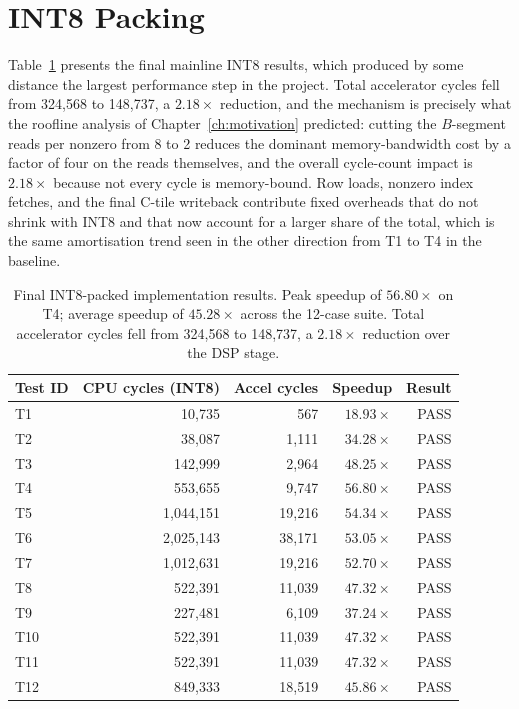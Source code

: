 \section{INT8 Packing}

Table~\ref{tab:int8-results} presents the final mainline INT8 results,
which produced by some distance the largest performance step in the
project. Total accelerator cycles fell from 324,568 to 148,737, a
$2.18\times$ reduction, and the mechanism is precisely what the roofline
analysis of Chapter~\ref{ch:motivation} predicted: cutting the
$B$-segment reads per nonzero from 8 to 2 reduces the dominant
memory-bandwidth cost by a factor of four on the reads themselves, and
the overall cycle-count impact is $2.18\times$ because not every cycle
is memory-bound. Row loads, nonzero index fetches, and the final C-tile
writeback contribute fixed overheads that do not shrink with INT8 and
that now account for a larger share of the total, which is the same
amortisation trend seen in the other direction from T1 to T4 in the
baseline.

\begin{table}[htbp]
  \centering
  \small
  \begin{tabular}{lrrrr}
  \toprule
  Test ID & CPU cycles (INT8) & Accel cycles & Speedup & Result \\
  \midrule
  T1  & 10,735   &    567 & $18.93\times$ & PASS \\
  T2  & 38,087   &  1,111 & $34.28\times$ & PASS \\
  T3  & 142,999  &  2,964 & $48.25\times$ & PASS \\
  T4  & 553,655  &  9,747 & $\mathbf{56.80\times}$ & PASS \\
  T5  & 1,044,151 & 19,216 & $54.34\times$ & PASS \\
  T6  & 2,025,143 & 38,171 & $53.05\times$ & PASS \\
  T7  & 1,012,631 & 19,216 & $52.70\times$ & PASS \\
  T8  & 522,391  & 11,039 & $47.32\times$ & PASS \\
  T9  & 227,481  &  6,109 & $37.24\times$ & PASS \\
  T10 & 522,391  & 11,039 & $47.32\times$ & PASS \\
  T11 & 522,391  & 11,039 & $47.32\times$ & PASS \\
  T12 & 849,333  & 18,519 & $45.86\times$ & PASS \\
  \bottomrule
  \end{tabular}
  \caption{Final INT8-packed implementation results. Peak speedup of
           $56.80\times$ on T4; average speedup of $45.28\times$ across
           the 12-case suite. Total accelerator cycles fell from 324,568
           to 148,737, a $2.18\times$ reduction over the DSP stage.}
  \label{tab:int8-results}
\end{table}

